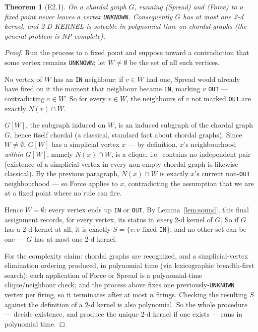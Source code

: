 \documentclass[11pt]{article}
\theoremstyle{plain}
\newtheorem{theorem}{Theorem}
\theoremstyle{definition}
\begin{document}
\begin{theorem}[E2.1]
On a chordal graph $G$, running (Spread) and (Force) to a fixed point never leaves a
vertex \texttt{UNKNOWN}. Consequently $G$ has at most one 2-d kernel, and 2-D KERNEL is
solvable in polynomial time on chordal graphs (the general problem is NP-complete).
\end{theorem}

\begin{proof}
Run the process to a fixed point and suppose toward a contradiction that some vertex
remains \texttt{UNKNOWN}; let $W \ne \emptyset$ be the set of all such vertices.

No vertex of $W$ has an \texttt{IN} neighbour: if $v \in W$ had one, Spread would
already have fired on it the moment that neighbour became \texttt{IN}, marking $v$
\texttt{OUT} — contradicting $v \in W$. So for every $v \in W$, the neighbours of $v$
not marked \texttt{OUT} are exactly $N(v) \cap W$.

$G[W]$, the subgraph induced on $W$, is an induced subgraph of the chordal graph $G$,
hence itself chordal (a classical, standard fact about chordal graphs). Since
$W \ne \emptyset$, $G[W]$ has a simplicial vertex $x$ — by definition, $x$'s
neighbourhood \emph{within $G[W]$}, namely $N(x) \cap W$, is a clique, i.e.\ contains
no independent pair (existence of a simplicial vertex in every non-empty chordal
graph is likewise classical). By the previous paragraph, $N(x) \cap W$ is exactly
$x$'s current non-\texttt{OUT} neighbourhood — so Force applies to $x$, contradicting
the assumption that we are at a fixed point where no rule can fire.

Hence $W = \emptyset$: every vertex ends up \texttt{IN} or \texttt{OUT}. By
Lemma~\ref{lem:sound}, this final assignment records, for every vertex, its status in
\emph{every} 2-d kernel of $G$. So if $G$ has a 2-d kernel at all, it is exactly
$S = \{v : v \text{ fixed } \texttt{IN}\}$, and no other set can be one — $G$ has at
most one 2-d kernel.

For the complexity claim: chordal graphs are recognized, and a simplicial-vertex
elimination ordering produced, in polynomial time (via lexicographic breadth-first
search); each application of Force or Spread is a polynomial-time clique/neighbour
check; and the process above fixes one previously-\texttt{UNKNOWN} vertex per
firing, so it terminates after at most $n$ firings. Checking the resulting $S$
against the definition of a 2-d kernel is also polynomial. So the whole procedure —
decide existence, and produce the unique 2-d kernel if one exists — runs in
polynomial time.
\end{proof}
\end{document}
